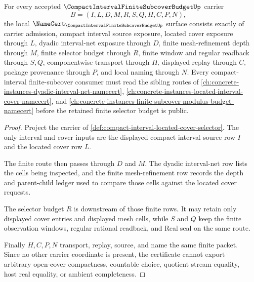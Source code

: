 \begin{theorem}
\label{thm:compact-interval-finite-subcover-budget}
For every accepted $\CompactIntervalFiniteSubcoverBudgetUp$ carrier
$$
B=(I,L,D,M,R,S,Q,H,C,P,N),
$$
the local $\NameCert_{\CompactIntervalFiniteSubcoverBudgetUp}$ surface consists exactly of carrier admission, compact interval source exposure, located cover exposure through $L$, dyadic interval-net exposure through $D$, finite mesh-refinement depth through $M$, finite selector budget through $R$, finite window and regular readback through $S,Q$, componentwise transport through $H$, displayed replay through $C$, package provenance through $P$, and local naming through $N$. Every compact-interval finite-subcover consumer must read the sibling routes of \autoref{ch:concrete-instances-dyadic-interval-net-namecert}, \autoref{ch:concrete-instances-located-interval-cover-namecert}, and \autoref{ch:concrete-instances-finite-subcover-modulus-budget-namecert} before the retained finite selector budget is public.
\end{theorem}
\begin{proof}
Project the carrier of \autoref{def:compact-interval-located-cover-selector}. The only interval and cover inputs are the displayed compact interval source row $I$ and the located cover row $L$.

The finite route then passes through $D$ and $M$. The dyadic interval-net row lists the cells being inspected, and the finite mesh-refinement row records the depth and parent-child ledger used to compare those cells against the located cover requests.

The selector budget $R$ is downstream of those finite rows. It may retain only displayed cover entries and displayed mesh cells, while $S$ and $Q$ keep the finite observation windows, regular rational readback, and Real seal on the same route.

Finally $H,C,P,N$ transport, replay, source, and name the same finite packet. Since no other carrier coordinate is present, the certificate cannot export arbitrary open-cover compactness, countable choice, quotient stream equality, host real equality, or ambient completeness.
\end{proof}


